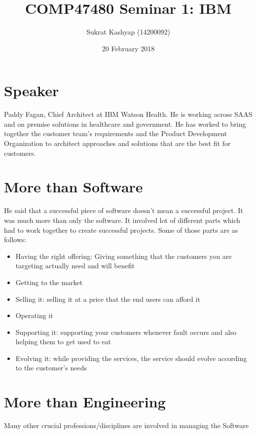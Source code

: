 \documentclass[10pt]{article}
\title{\vspace{-3.0cm}COMP47480 Seminar 1: IBM}
\author{Sukrat Kashyap (14200092)}
\date{20 February 2018}
\begin{document}
\maketitle
\section{Speaker}

Paddy Fagan, Chief Architect at IBM Watson Health. He is working across SAAS and on premise solutions in healthcare and government. He has worked to bring together the customer team's requirements and the Product Development Organization to architect approaches and solutions that are the best fit for customers.

\section{More than Software}

He said that a successful piece of software doesn't mean a successful project. It was much more than only the software. It involved lot of different parts which had to work together to create successful projects. Some of those parts are as follows:

\begin{itemize}
    \item Having the right offering: Giving something that the customers you are targeting actually need and will benefit
    \item Getting to the market
    \item Selling it: selling it at a price that the end users can afford it
    \item Operating it
    \item Supporting it: supporting your customers whenever fault occurs and also helping them to get used to eat
    \item Evolving it: while providing the services, the service should evolve according to the customer's needs
\end{itemize}

\section{More than Engineering}

Many other crucial professions/disciplines are involved in managing the Software
\end{document}
